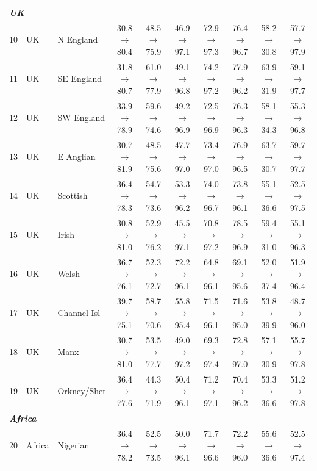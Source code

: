 \begin{table}[t]
{\begin{tabular}{rll c c c c c c c}
\midrule
\multicolumn{10}{l}{\textit{\textbf{UK}}} \\
10 & UK & N England & 30.8$\rightarrow$80.4 & 48.5$\rightarrow$75.9 & 46.9$\rightarrow$97.1 & 72.9$\rightarrow$97.3 & 76.4$\rightarrow$96.7 & 58.2$\rightarrow$30.8 & 57.7$\rightarrow$97.9 \\
11 & UK & SE England & 31.8$\rightarrow$80.7 & 61.0$\rightarrow$77.9 & 49.1$\rightarrow$96.8 & 74.2$\rightarrow$97.2 & 77.9$\rightarrow$96.2 & 63.9$\rightarrow$31.9 & 59.1$\rightarrow$97.7 \\
12 & UK & SW England & 33.9$\rightarrow$78.9 & 59.6$\rightarrow$74.6 & 49.2$\rightarrow$96.9 & 72.5$\rightarrow$96.9 & 76.3$\rightarrow$96.3 & 58.1$\rightarrow$34.3 & 55.3$\rightarrow$96.8 \\
13 & UK & E Anglian & 30.7$\rightarrow$81.9 & 48.5$\rightarrow$75.6 & 47.7$\rightarrow$97.0 & 73.4$\rightarrow$97.0 & 76.9$\rightarrow$96.5 & 63.7$\rightarrow$30.7 & 59.7$\rightarrow$97.7 \\
14 & UK & Scottish & 36.4$\rightarrow$78.3 & 54.7$\rightarrow$73.6 & 53.3$\rightarrow$96.2 & 74.0$\rightarrow$96.7 & 73.8$\rightarrow$96.1 & 55.1$\rightarrow$36.6 & 52.5$\rightarrow$97.5 \\
15 & UK & Irish & 30.8$\rightarrow$81.0 & 52.9$\rightarrow$76.2 & 45.5$\rightarrow$97.1 & 70.8$\rightarrow$97.2 & 78.5$\rightarrow$96.9 & 59.4$\rightarrow$31.0 & 55.1$\rightarrow$96.3 \\
16 & UK & Welsh & 36.7$\rightarrow$76.1 & 52.3$\rightarrow$72.7 & 72.2$\rightarrow$96.1 & 64.8$\rightarrow$96.1 & 69.1$\rightarrow$95.6 & 52.0$\rightarrow$37.4 & 51.9$\rightarrow$96.4 \\
17 & UK & Channel Isl & 39.7$\rightarrow$75.1 & 58.7$\rightarrow$70.6 & 55.8$\rightarrow$95.4 & 71.5$\rightarrow$96.1 & 71.6$\rightarrow$95.0 & 53.8$\rightarrow$39.9 & 48.7$\rightarrow$96.0 \\
18 & UK & Manx & 30.7$\rightarrow$81.0 & 53.5$\rightarrow$77.7 & 49.0$\rightarrow$97.2 & 69.3$\rightarrow$97.4 & 72.8$\rightarrow$97.0 & 57.1$\rightarrow$30.9 & 55.7$\rightarrow$97.8 \\
19 & UK & Orkney/Shet & 36.4$\rightarrow$77.6 & 44.3$\rightarrow$71.9 & 50.4$\rightarrow$96.1 & 71.2$\rightarrow$97.1 & 70.4$\rightarrow$96.2 & 53.3$\rightarrow$36.6 & 51.2$\rightarrow$97.8 \\
\midrule
\multicolumn{10}{l}{\textit{\textbf{Africa}}} \\
20 & Africa & Nigerian & 36.4$\rightarrow$78.2 & 52.5$\rightarrow$73.5 & 50.0$\rightarrow$96.1 & 71.7$\rightarrow$96.6 & 72.2$\rightarrow$96.0 & 55.6$\rightarrow$36.6 & 52.5$\rightarrow$97.4 \\

\end{tabular}}
\end{table}
